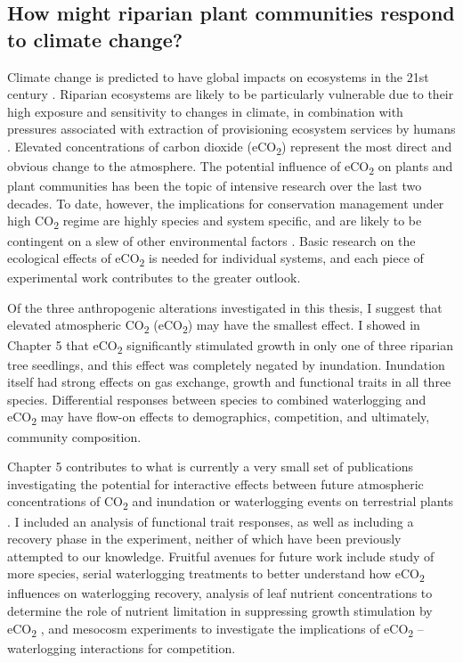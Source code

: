 \documentclass[openright,12pt,a4paper]{memoir}
\begin{document}
{{\subsection{How might riparian plant communities respond to climate change?}
Climate change is predicted to have global impacts on ecosystems in the 21st century \citep{IPCC2014}. Riparian ecosystems are likely to be particularly vulnerable due to their high exposure and sensitivity to changes in climate, in combination with pressures associated with extraction of provisioning ecosystem services by humans \citep{Capon2013}. Elevated concentrations of carbon dioxide (eCO\textsubscript{2}) represent the most direct and obvious change to the atmosphere. The potential influence of eCO\textsubscript{2} on plants and plant communities has been the topic of intensive research over the last two decades. To date, however, the implications for conservation management under high CO\textsubscript{2} regime are highly species and system specific, and are likely to be contingent on a slew of other environmental factors \citep{Poorter2003a, Norby2011, Poorter2011, Reich2014}. Basic research on the ecological effects of eCO\textsubscript{2} is needed for individual systems, and each piece of experimental work contributes to the greater outlook.

Of the three anthropogenic alterations investigated in this thesis, I suggest that elevated atmospheric CO\textsubscript{2} (eCO\textsubscript{2}) may have the smallest effect. I showed in Chapter 5 that eCO\textsubscript{2} significantly stimulated growth in only one of three riparian tree seedlings, and this effect was completely negated by inundation. Inundation itself had strong effects on gas exchange, growth and functional traits in all three species. Differential responses between species to combined waterlogging and eCO\textsubscript{2} may have flow-on effects to demographics, competition, and ultimately, community composition.
 
Chapter 5 contributes to what is currently a very small set of publications investigating the potential for interactive effects between future atmospheric concentrations of CO\textsubscript{2} and inundation or waterlogging events on terrestrial plants \citep{Megonigal2005, Shimono2012, Arenque2014}. I included an analysis of functional trait responses, as well as including a recovery phase in the experiment, neither of which have been previously attempted to our knowledge. Fruitful avenues for future work include study of more species, serial waterlogging treatments to better understand how eCO\textsubscript{2} influences on waterlogging recovery, analysis of leaf nutrient concentrations to determine the role of nutrient limitation in suppressing growth stimulation by eCO\textsubscript{2} \citep{Reich2014}, and mesocosm experiments to investigate the implications of eCO\textsubscript{2} – waterlogging interactions for competition.

}}
\end{document}
